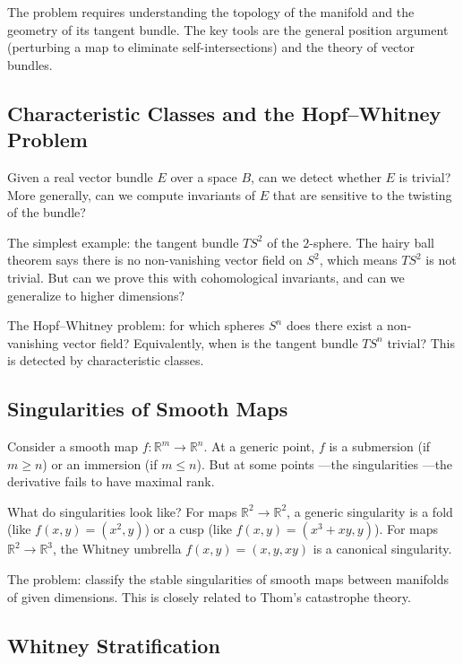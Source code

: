The problem requires understanding the topology of the manifold and the geometry of its tangent bundle. The key tools are the general position argument (perturbing a map to eliminate self-intersections) and the theory of vector bundles.

\subsection{Characteristic Classes and the Hopf--Whitney Problem}

Given a real vector bundle $E$ over a space $B$, can we detect whether $E$ is trivial? More generally, can we compute invariants of $E$ that are sensitive to the twisting of the bundle?

The simplest example: the tangent bundle $TS^2$ of the $2$-sphere. The hairy ball theorem says there is no non-vanishing vector field on $S^2$, which means $TS^2$ is not trivial. But can we prove this with cohomological invariants, and can we generalize to higher dimensions?

The Hopf--Whitney problem: for which spheres $S^n$ does there exist a non-vanishing vector field? Equivalently, when is the tangent bundle $TS^n$ trivial? This is detected by characteristic classes.

\subsection{Singularities of Smooth Maps}

Consider a smooth map $f: \mathbb{R}^m \to \mathbb{R}^n$. At a generic point, $f$ is a submersion (if $m \geq n$) or an immersion (if $m \leq n$). But at some points $\text{---}$the singularities $\text{---}$the derivative fails to have maximal rank.

What do singularities look like? For maps $\mathbb{R}^2 \to \mathbb{R}^2$, a generic singularity is a fold (like $f(x,y) = (x^2, y)$) or a cusp (like $f(x,y) = (x^3 + xy, y)$). For maps $\mathbb{R}^2 \to \mathbb{R}^3$, the Whitney umbrella $f(x,y) = (x, y, xy)$ is a canonical singularity.

The problem: classify the stable singularities of smooth maps between manifolds of given dimensions. This is closely related to Thom's catastrophe theory.

\subsection{Whitney Stratification}

